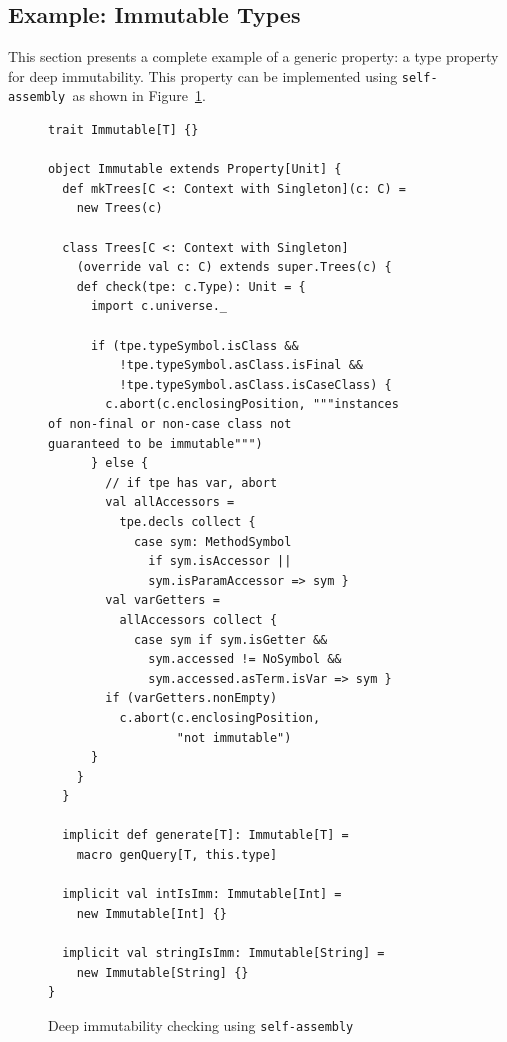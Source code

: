 \documentclass[preprint]{sigplanconf}
\newcommand{\selfassembly}{\texttt{self-assembly~}}
\begin{document}
\subsection{Example: Immutable Types}\label{sec:genprop-example}



This section presents a complete example of a generic property: a type
property for deep immutability. This property can be implemented using
\selfassembly as shown in Figure~\ref{fig:immutable}.


\begin{figure}
\centering
\begin{lstlisting}
trait Immutable[T] {}

object Immutable extends Property[Unit] {
  def mkTrees[C <: Context with Singleton](c: C) =
    new Trees(c)

  class Trees[C <: Context with Singleton]
    (override val c: C) extends super.Trees(c) {
    def check(tpe: c.Type): Unit = {
      import c.universe._

      if (tpe.typeSymbol.isClass &&
          !tpe.typeSymbol.asClass.isFinal &&
          !tpe.typeSymbol.asClass.isCaseClass) {
        c.abort(c.enclosingPosition, """instances
of non-final or non-case class not
guaranteed to be immutable""")
      } else {
        // if tpe has var, abort
        val allAccessors =
          tpe.decls collect {
            case sym: MethodSymbol
              if sym.isAccessor ||
              sym.isParamAccessor => sym }
        val varGetters =
          allAccessors collect {
            case sym if sym.isGetter &&
              sym.accessed != NoSymbol &&
              sym.accessed.asTerm.isVar => sym }
        if (varGetters.nonEmpty)
          c.abort(c.enclosingPosition,
                  "not immutable")
      }
    }
  }

  implicit def generate[T]: Immutable[T] =
    macro genQuery[T, this.type]

  implicit val intIsImm: Immutable[Int] =
    new Immutable[Int] {}

  implicit val stringIsImm: Immutable[String] =
    new Immutable[String] {}
}
\end{lstlisting}
  \caption{Deep immutability checking using \selfassembly}
  \label{fig:immutable}
\end{figure}
\end{document}
